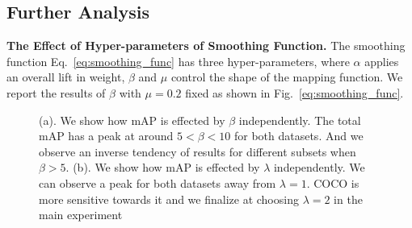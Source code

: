 \documentclass[runningheads]{llncs}
\begin{document}
\begin{table}[t]
    \centering
    \caption{
    	Experimental results on re-sampling combined with several re-weighting techniques. CB loss with focal is reported by~\cite{cui2019cb} to perform better, so all the other techniques are enhanced with focal loss for fair comparison
    }
    \label{table:RS_plus_RW}
   \end{table} 
\subsection{Further Analysis}

\noindent\textbf{The Effect of Hyper-parameters of Smoothing Function.}
The smoothing function Eq.~\ref{eq:smoothing_func} has three hyper-parameters, where $\alpha$ applies an overall lift in weight,  $\beta$ and $\mu$ control the shape of the mapping function. We report the results of $\beta$ with $\mu=0.2$ fixed as shown in Fig.~\ref{eq:smoothing_func}. 
\begin{figure}[t]
     \hfill
    \caption{
        (a). We show how mAP is effected by $\beta$ independently. The total mAP has a peak at around $5<\beta<10$ for both datasets. And we observe an inverse tendency of results for different subsets when $\beta>5$.
        (b). We show how mAP is effected by $\lambda$ independently. We can observe a peak for both datasets away from $\lambda=1$. COCO is more sensitive towards it and we finalize at choosing $\lambda=2$ in the main experiment
    } 
\end{figure}
\end{document}
